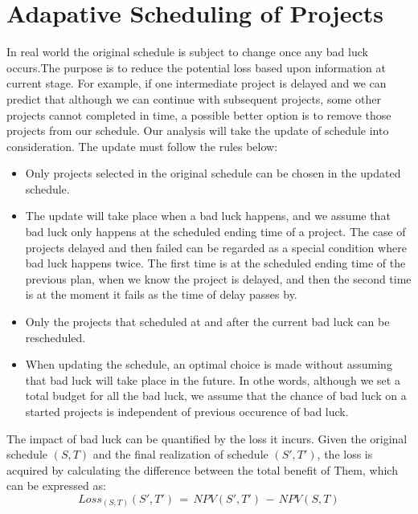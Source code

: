 \documentclass[final,3p,times]{elsarticle}
\begin{document}
\section{Adapative Scheduling of Projects}
In real world the original schedule is subject to change once any bad luck occurs.The purpose is to reduce the potential loss based upon information at current stage. For example, if one intermediate project is delayed and we can predict that although we can continue with subsequent projects, some other projects cannot completed in time, a possible better option is to remove those projects from our schedule. Our analysis will take the update of schedule into consideration. The update must follow the rules below:
\begin{itemize}
\item Only projects selected in the original schedule can be chosen in the updated schedule.
\item The update will take place when a bad luck happens, and we assume that bad luck only happens at the scheduled ending time of a project. The case of projects delayed and then failed can be regarded as a special condition where bad luck happens twice. The first time is at the scheduled ending time of the previous plan, when we know the project is delayed, and then the second time is at the moment it fails as the time of delay passes by. 
\item Only the projects that scheduled at and after the current bad luck can be rescheduled.
\item When updating the schedule, an optimal choice is made without assuming that bad luck will take place in the future. In othe words, although we set a total budget for all the bad luck, we assume that the chance of bad luck on a started projects is independent of previous occurence of bad luck. 
\end{itemize}
The impact of bad luck can be quantified by the loss it incurs. Given the original schedule $(S,T)$ and the final realization of schedule $(S',T')$, the loss is acquired by calculating the difference between the total benefit of Them, which can be expressed as:
\begin{equation}
Loss_{(S,T)}(S',T')\,=\, NPV(S',T')\,-\,NPV(S,T)
\end{equation}
\end{document}
